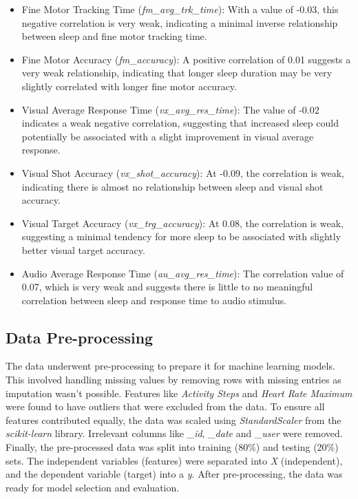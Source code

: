 \begin{itemize}
    \item Fine Motor Tracking Time (\textit{fm\_avg\_trk\_time}): With a value of -0.03, this negative correlation is very weak, indicating a minimal inverse relationship between sleep
          and fine motor tracking time.

    \item Fine Motor Accuracy (\textit{fm\_accuracy}): A positive correlation of 0.01 suggests a very weak relationship, indicating that longer sleep duration
          may be very slightly correlated with longer fine motor accuracy.

    \item Visual Average Response Time (\textit{vx\_avg\_res\_time}): The value of -0.02 indicates a weak negative correlation, suggesting that increased sleep could potentially be
          associated with a slight improvement in visual average response.

    \item Visual Shot Accuracy (\textit{vx\_shot\_accuracy}): At -0.09, the correlation is weak, indicating there is almost no relationship between sleep and visual shot accuracy.

    \item Visual Target Accuracy (\textit{vx\_trg\_accuracy}): At 0.08, the correlation is weak, suggesting a minimal tendency for more sleep to be associated with slightly
          better visual target accuracy.

    \item Audio Average Response Time (\textit{au\_avg\_res\_time}): The correlation value of 0.07, which is very weak and suggests there is little to no meaningful correlation between
          sleep and response time to audio stimulus.

\end{itemize}

\subsection{Data Pre-processing}
The data underwent pre-processing to prepare it for machine learning models. This involved handling missing values by removing rows with missing entries as imputation wasn't possible.
Features like \textit{Activity Steps} and \textit{Heart Rate Maximum} were found to have outliers that were excluded from the data.
To ensure all features contributed equally, the data was scaled using \textit{StandardScaler} from the \textit{scikit-learn} library. Irrelevant columns like \textit{\_id}, \textit{\_date} and
\textit{\_user} were removed. Finally, the pre-processed data was split into training (80\%) and testing (20\%) sets. The independent variables (features) were separated into
\textit{X} (independent), and the dependent variable (target) into a \textit{y}. After pre-processing, the data was ready for model selection and evaluation.


